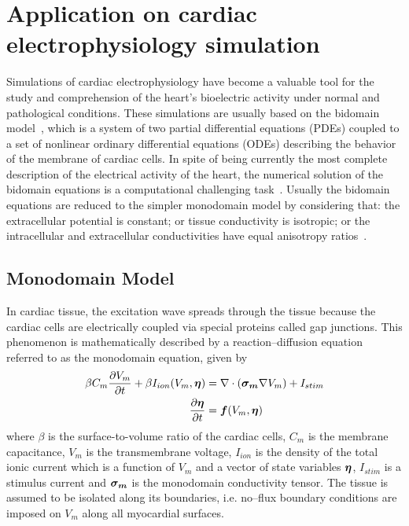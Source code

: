 \section{Application on cardiac electrophysiology simulation}

Simulations of cardiac electrophysiology have become a valuable tool for the
study and comprehension of the heart's bioelectric activity under normal and
pathological conditions. These simulations are usually based on the bidomain
model~\cite{Sundnes2006Book}, which is a system of two partial differential
equations (PDEs) coupled to a set of nonlinear ordinary differential equations
(ODEs) describing the behavior of the membrane of cardiac cells. In spite of
being currently the most complete description of the electrical activity of the
heart, the numerical solution of the bidomain equations is a computational
challenging task~\cite{Weber2004}. Usually the bidomain equations are reduced to
the simpler monodomain model by considering that: the extracellular potential is
constant; or tissue conductivity is isotropic; or the intracellular and
extracellular conductivities have equal anisotropy
ratios~\cite{Sundnes2006Book}.

\subsection{Monodomain Model}

In cardiac tissue, the excitation wave spreads through the tissue because
the cardiac cells are electrically coupled via special proteins called
gap junctions. This phenomenon is mathematically described by a
reaction--diffusion equation referred to as the monodomain equation, given by
\begin{align}
   \beta C_m \displaystyle\frac{\partial V_m}{\partial t} + \beta I_{ion}(V_m,\boldsymbol{\eta}) &=
   \nabla \cdot (\boldsymbol{\sigma_m} \nabla V_m) + I_{stim}\\
\displaystyle\frac{\partial \boldsymbol{\eta}}{\partial t} &= \boldsymbol{f}(V_m, \boldsymbol{\eta})
   \label{eq:Monodomain}
\end{align}
where $\beta$ is the surface-to-volume ratio of the cardiac cells,
$C_m$ is the membrane capacitance, $V_m$ is the transmembrane voltage,
$I_{ion}$ is the density of the total ionic current which is a function of
$V_m$ and a vector of state variables $\boldsymbol{\eta}$, $I_{stim}$ is a stimulus
current and $\boldsymbol{\sigma_m}$ is the monodomain conductivity tensor. The tissue
is assumed to be isolated along its boundaries, i.e. no--flux boundary
conditions are imposed on $V_m$ along all myocardial surfaces.

